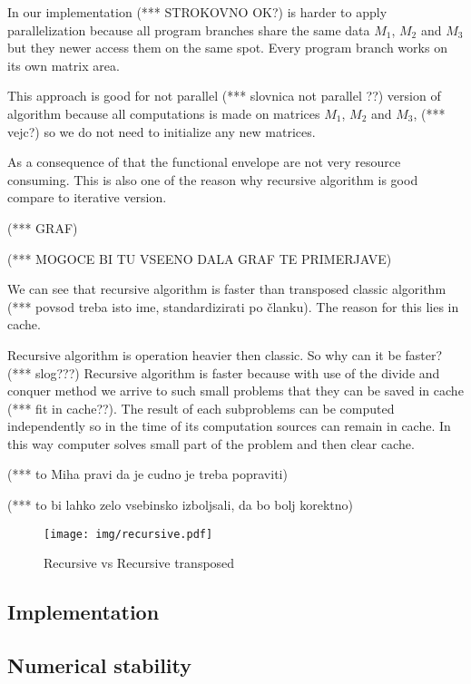 \documentclass[a4paper,11pt]{article}
\begin{document}
In our implementation (*** STROKOVNO OK?) 
is harder to apply parallelization because 
all  %
program branches share the same data 
$M_{1}$, $M_{2}$ and $M_{3}$ but they 
newer access them on the same spot. 
Every program branch works on its own 
matrix area. 

This approach is good for not parallel (*** slovnica not parallel ??) 
version of algorithm because all 
computations is made on matrices 
$M_{1}$, $M_{2}$ and $M_{3}$, (*** vejc?)
so we do not need to initialize any new 
matrices. 

As a consequence of that the functional 
envelope are not very resource consuming. 
This is also one of the reason why 
recursive algorithm is good compare to 
iterative version.

(*** GRAF)

(*** MOGOCE BI TU VSEENO DALA GRAF TE PRIMERJAVE)

We can see that recursive algorithm is 
faster than transposed classic algorithm 
(*** povsod treba isto ime, standardizirati po članku). The reason for this lies in 
cache. 

Recursive algorithm is operation heavier 
then classic. So why can it be faster? 
(*** slog???)
Recursive algorithm is faster because 
with use of the divide and conquer method 
we arrive to such small problems that they 
can be saved in cache (*** fit in cache??). 
The result of each subproblems can be computed
independently so in the time of its computation 
sources can remain in cache. 
In this way computer solves small part of the problem and then clear cache. 

(*** to Miha pravi da je cudno je treba popraviti)

(*** to bi lahko zelo vsebinsko izboljsali, 
da bo bolj korektno)

\begin{figure}[h]
\centering
\texttt{[image: img/recursive.pdf]}
\caption{Recursive vs Recursive transposed}
\label{fig:classic}
\end{figure}


\subsection{Implementation}

\subsection{Numerical stability}
\end{document}
